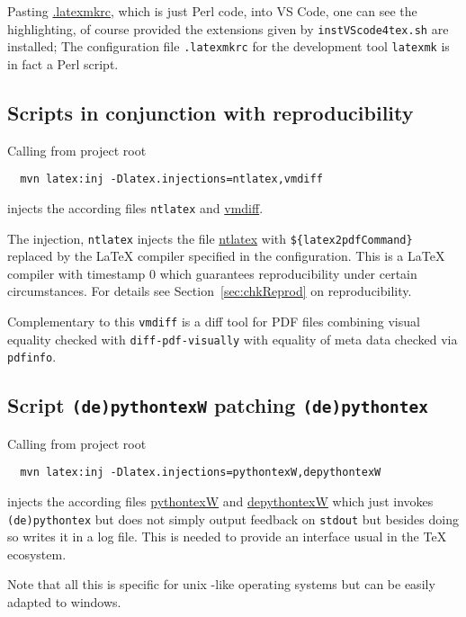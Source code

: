 Pasting \href{\urlSite fromTex/.latexmkrc}{.latexmkrc}, 
which is just Perl code, 
into VS Code, one can see the highlighting, 
of course provided the extensions given by \texttt{instVScode4tex.sh} are installed; 
The configuration file \texttt{.latexmkrc} 
for the development tool \texttt{latexmk} is in fact a Perl script. 


\subsection{Scripts in conjunction with reproducibility }\label{subsec:ntlatexVmdiff}

Calling from project root 
%
\begin{Verbatim}
  mvn latex:inj -Dlatex.injections=ntlatex,vmdiff
\end{Verbatim}
%
injects the according files 
\texttt{ntlatex} and \href{\urlSite fromMain/ntlatex}{vmdiff}. 

The injection, \texttt{ntlatex} 
injects the file \href{\urlSite fromMain/ntlatex}{ntlatex} 
with \texttt{\$\{latex2pdfCommand\}} 
replaced by the \LaTeX{} compiler specified in the configuration. 
This is a \LaTeX{} compiler with timestamp 0 which guarantees reproducibility 
under certain circumstances. 
For details see Section~\ref{sec:chkReprod} on reproducibility. 

Complementary to this \texttt{vmdiff} is a diff tool for PDF files 
combining visual equality checked with \texttt{diff-pdf-visually} 
with equality of meta data checked via \texttt{pdfinfo}. 

\subsection{Script \texttt{(de)pythontexW} patching \texttt{(de)pythontex} }%
\label{subsec:pythontexW}

Calling from project root 
%
\begin{Verbatim}
  mvn latex:inj -Dlatex.injections=pythontexW,depythontexW
\end{Verbatim}
%
injects the according files 
\href{\urlSite fromMain/pythontexW}{pythontexW} and 
\href{\urlSite fromMain/depythontexW}{depythontexW}
which just invokes \texttt{(de)pythontex} %
but does not simply output feedback on \texttt{stdout}
but besides doing so writes it in a log file. 
This is needed to provide an interface usual in the \TeX{} ecosystem. 

Note that all this is specific for unix -like operating systems 
but can be easily adapted to windows. 

